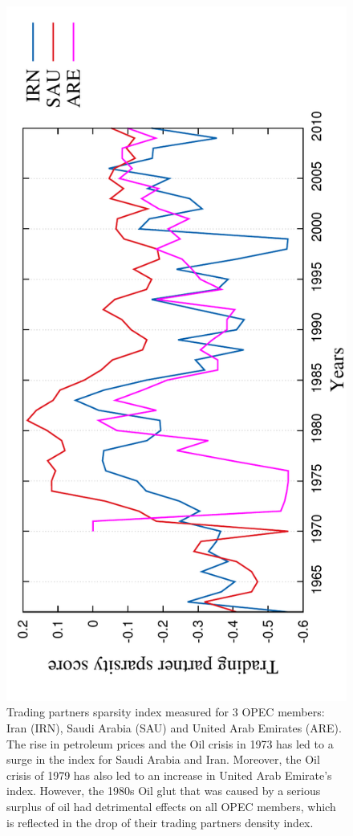 \begin{figure}[H]
  \centering
\includegraphics[angle=-90,scale=0.6]
{../code/extra_results/trading_partner_density/scores/opec2}
\caption[Trading partners sparsity index -- Iran (IRN), Saudi Arabia (SAU) and United Arab Emirates (ARE)]{Trading partners sparsity index measured for 3 OPEC members: Iran (IRN), Saudi Arabia (SAU) and United Arab Emirates (ARE). The rise in petroleum prices and the Oil crisis in 1973 has led to a surge in the index for Saudi Arabia and Iran. Moreover, the Oil crisis of 1979 has also led to an increase in United Arab Emirate's index. However, the 1980s Oil glut that was caused by a serious surplus of oil had detrimental effects on all OPEC members, which is reflected in the drop of their trading partners density index.}
\label{opec_sparsity_index}
\end{figure}

